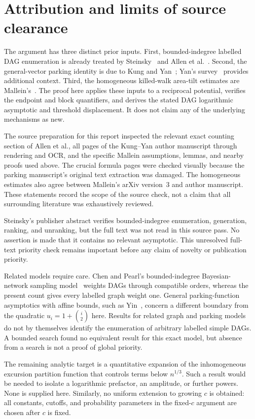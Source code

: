 \documentclass[11pt,letterpaper]{article}
\numberwithin{equation}{section}
\theoremstyle{remark}\newtheorem{remark}[theorem]{Remark}
\begin{document}
\section{Attribution and limits of source clearance}\label{bid:sec:sources}
The argument has three distinct prior inputs. First, bounded-indegree
labelled DAG enumeration is already treated by Steinsky~\cite{steinsky}
and Allen et al.~\cite{allen}. Second, the general-vector parking
identity is due to Kung and Yan~\cite{kungyan}; Yan's survey~\cite{yan}
provides additional context. Third, the homogeneous killed-walk
area-tilt estimates are Mallein's~\cite{mallein}. The proof here applies
these inputs to a reciprocal potential, verifies the endpoint and
block quantifiers, and derives the stated DAG logarithmic asymptotic
and threshold displacement. It does not claim any of the underlying
mechanisms as new.

The source preparation for this report inspected the relevant exact
counting section of Allen et al., all pages of the Kung--Yan author
manuscript through rendering and OCR, and the specific Mallein
assumptions, lemmas, and nearby proofs used above. The crucial formula
pages were checked visually because the parking manuscript's original
text extraction was damaged. The homogeneous estimates also agree
between Mallein's arXiv version~3 and author manuscript. These statements
record the scope of the source check, not a claim that all surrounding
literature was exhaustively reviewed.

Steinsky's publisher abstract verifies bounded-indegree enumeration,
generation, ranking, and unranking, but the full text was not read in
this source pass. No assertion is made that it contains no relevant
asymptotic. This unresolved full-text priority check remains important
before any claim of novelty or publication priority.

Related models require care. Chen and Pearl's bounded-indegree
Bayesian-network sampling model~\cite{chenpearl} weights DAGs through
compatible orders, whereas the present count gives every labelled graph
weight one. General parking-function asymptotics with affine bounds,
such as Yin~\cite{yin}, concern a different boundary from the quadratic
$u_i=1+\binom i2$ here. Results for related graph and parking models do not by themselves
identify the enumeration of arbitrary labelled simple DAGs. A bounded search found no equivalent
result for this exact model, but absence from a search is not a proof
of global priority.

The remaining analytic target is a quantitative expansion of the
inhomogeneous excursion partition function that controls terms below
$n^{1/3}$. Such a result would be needed to isolate a logarithmic
prefactor, an amplitude, or further powers. None is supplied here.
Similarly, no uniform extension to growing $c$ is obtained: all constants,
cutoffs, and probability parameters in the fixed-$c$ argument are chosen
after $c$ is fixed.
\end{document}
